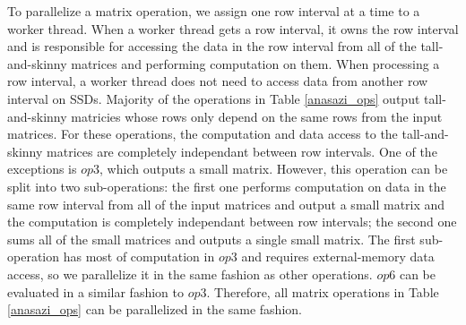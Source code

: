 To parallelize a matrix operation, we assign one row interval at a time to
a worker thread. When a worker thread gets a row interval, it owns the row
interval and is responsible for accessing the data in the row interval from
all of the tall-and-skinny matrices and performing computation on them.
When processing a row interval, a worker thread does not need to access data
from another row interval on SSDs.
Majority of the operations in Table \ref{anasazi_ops} output tall-and-skinny
matricies whose rows only depend on the same rows from the input matrices.
For these operations, the computation and data access to the tall-and-skinny
matrices are completely independant between row intervals. One of the exceptions is
$op3$, which outputs a small matrix. However, this operation can be split into
two sub-operations: the first one performs computation on data in the same row
interval from all of the input matrices and output a small matrix and the computation
is completely independant between row intervals; the second one sums all of
the small matrices and outputs a single small matrix. The first sub-operation
has most of computation in $op3$ and requires external-memory data access,
so we parallelize it in the same fashion as other operations.
$op6$ can be evaluated in a similar fashion to $op3$. Therefore, all matrix
operations in Table \ref{anasazi_ops} can be parallelized in the same fashion.


